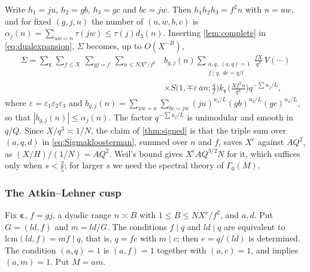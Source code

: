 \documentclass[11pt,colorlinks]{charlie}
\begin{document}
Write $h_1=ju$, $h_2=gb$, $h_3=gc$ and $bc=jw$. Then $h_1h_2h_3=f^2n$ with $n=uw$, and for fixed $(g,j,n)$ the number of $(u,w,b,c)$ is $\alpha_j(n)=\sum_{uw=n}\tau(jw)\le\tau(j)d_3(n)$. Inserting \cref{lem:complete} in \eqref{eq:dualexpansion}, $\Sigma$ becomes, up to $O(X^{-B})$,
\begin{equation}\label{eq:Sigmakloosterman}
 \begin{split}
 \Sigma=\sum_{\boldsymbol\varepsilon}\sum_{f\le X}\ \sum_{gj=f}\ \sum_{n\le NX^\nu/f^2}&b_{g,j}(n)\sum_{\substack{a,q,\ (a,q)=1\\ f\mid q,\ de=q/l}}\frac{fX}{q^3}\,V(\cdots)\\
 &\times S\Big(1,\mp\varepsilon\,\overline an;\frac qf\Big)k_{\boldsymbol\varepsilon}\Big(\frac{Xf^2n}{q^3}\Big)q^{-\sum u_j/L},
 \end{split}
\end{equation}
where $\varepsilon=\varepsilon_1\varepsilon_2\varepsilon_3$ and $b_{g,j}(n)=\sum_{uw=n}\sum_{bc=jw}(ju)^{u_1/L}(gb)^{u_2/L}(gc)^{u_3/L}$, so that $|b_{g,j}(n)|\le\alpha_j(n)$. The factor $q^{-\sum u_j/L}$ is unimodular and smooth in $q/Q$. Since $X/q^3\asymp1/N$, the claim of \cref{thm:signed} is that the triple sum over $(a,q,d)$ in \eqref{eq:Sigmakloosterman}, summed over $n$ and $f$, saves $X^{c}$ against $AQ^2$, as $(X/H)/(1/N)=AQ^2$. Weil's bound gives $X^\epsilon AQ^{3/2}N$ for it, which suffices only when $s<\frac25$; for larger $s$ we need the spectral theory of $\Gamma_0(M)$.

\subsubsection{The Atkin--Lehner cusp}
Fix $\boldsymbol\varepsilon$, $f=gj$, a dyadic range $n\asymp B$ with $1\le B\le NX^\nu/f^2$, and $a,d$. Put $G=(ld,f)$ and $m=ld/G$. The conditions $f\mid q$ and $ld\mid q$ are equivalent to $\mathrm{lcm}(ld,f)=mf\mid q$, that is, $q=fc$ with $m\mid c$; then $e=q/(ld)$ is determined. The condition $(a,q)=1$ is $(a,f)=1$ together with $(a,c)=1$, and implies $(a,m)=1$. Put $M=am$.
\end{document}
